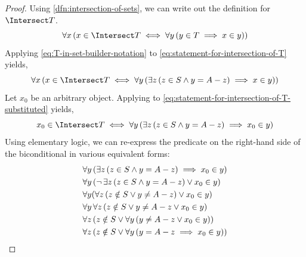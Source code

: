 \begin{proof}
    \vspace{0.5cm}
    \noindent
    Using \cref{dfn:intersection-of-sets}, we can write out the definition for \( \Intersect T \).
    \begin{equation}
        \label{eq:statement-for-intersection-of-T}
        \forall x \, \mleft( x \in \Intersect T
        \iff
        \forall y \, \mleft( y \in T \implies x \in y \mright) \mright)
    \end{equation}
    Applying \eqref{eq:T-in-set-builder-notation} to \eqref{eq:statement-for-intersection-of-T} yields,
    \begin{equation}
        \label{eq:statement-for-intersection-of-T-substituted}
        \forall x \, \mleft( x \in \Intersect T
        \iff
        \forall y \, \mleft( \exists z \, \mleft( z \in S \land y = A - z \mright) \implies x \in y \mright)\mright)
    \end{equation}
    Let \( x_{0} \) be an arbitrary object. Applying  to
    \eqref{eq:statement-for-intersection-of-T-substituted} yields,
    \begin{equation}
        \label{eq:instantiated-statement-for-intersection-of-T-substituted}
        x_{0} \in \Intersect T
        \iff
        \forall y \, \mleft( \exists z \, \mleft( z \in S \land y = A - z \mright) \implies x_{0} \in y \mright)
    \end{equation}
    Using elementary logic, we can re-express the predicate on the right-hand side of the biconditional
    in various equivalent forms:
    \begin{equation*}
        \begin{aligned}
            &\forall y \, \mleft( \exists z \, \mleft( z \in S \land
            y = A - z \mright) \implies x_{0} \in y \mright) \\
            &\forall y \, \mleft( \lnot \, \exists z \, \mleft( z \in S \land y = A - z \mright) \lor x_{0} \in y \mright) \\
            &\forall y \mleft( \forall z \, \mleft( z \notin S \lor y \neq A - z \mright) \lor x_{0} \in y \mright) \\
            &\forall y \, \forall z \, \mleft( z \notin S \lor y \neq A - z \lor x_{0} \in y \mright) \\
            &\forall z \, \mleft( z \notin S \lor \forall y \, \mleft( y \neq A - z \lor x_{0} \in y \mright) \mright)\\
            &\forall z \, \mleft( z \notin S \lor \forall y \, \mleft( y = A - z \implies x_{0} \in y \mright) \mright)\\

\end{aligned}
\end{equation*}
\end{proof}
